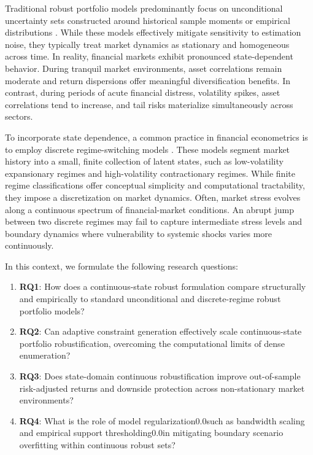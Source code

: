 \documentclass[smallextended]{svjour3}
\begin{document}
Traditional robust portfolio models predominantly focus on unconditional uncertainty sets constructed around historical sample moments or empirical distributions \citep{delage2010distributionally, esfahani2018data}. While these models effectively mitigate sensitivity to estimation noise, they typically treat market dynamics as stationary and homogeneous across time. In reality, financial markets exhibit pronounced state-dependent behavior. During tranquil market environments, asset correlations remain moderate and return dispersions offer meaningful diversification benefits. In contrast, during periods of acute financial distress, volatility spikes, asset correlations tend to increase, and tail risks materialize simultaneously across sectors.

To incorporate state dependence, a common practice in financial econometrics is to employ discrete regime-switching models \citep{ang2002international}. These models segment market history into a small, finite collection of latent states, such as low-volatility expansionary regimes and high-volatility contractionary regimes. While finite regime classifications offer conceptual simplicity and computational tractability, they impose a discretization on market dynamics. Often, market stress evolves along a continuous spectrum of financial-market conditions. An abrupt jump between two discrete regimes may fail to capture intermediate stress levels and boundary dynamics where vulnerability to systemic shocks varies more continuously.


In this context, we formulate the following research questions:
\begin{enumerate}
    \item \textbf{RQ1}: How does a continuous-state robust formulation compare structurally and empirically to standard unconditional and discrete-regime robust portfolio models?
    \item \textbf{RQ2}: Can adaptive constraint generation effectively scale continuous-state portfolio robustification, overcoming the computational limits of dense enumeration?
    \item \textbf{RQ3}: Does state-domain continuous robustification improve out-of-sample risk-adjusted returns and downside protection across non-stationary market environments?
    \item \textbf{RQ4}: What is the role of model regularization0.0such as bandwidth scaling and empirical support thresholding0.0in mitigating boundary scenario overfitting within continuous robust sets?
\end{enumerate}
\end{document}
